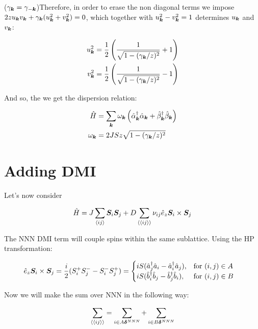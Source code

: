 ($\gamma_{\boldsymbol{k}} = \gamma_{-\boldsymbol{k}}$)Therefore, in order to erase the non diagonal terms we impose $2zu_{\boldsymbol{k}}v_{\boldsymbol{k}} + \gamma_{\boldsymbol{k}}(u_{\boldsymbol{k}}^2+v_{\boldsymbol{k}}^2) = 0$, which together with $u_{\boldsymbol{k}}^2-v_{\boldsymbol{k}}^2 = 1$ determines $u_{\boldsymbol{k}}$ and $v_{\boldsymbol{k}}$:

\begin{align*}
u_{\boldsymbol{k}}^2 &= \frac{1}{2}\left( \frac{1}{\sqrt{1-(\gamma_{\boldsymbol{k}}/z)^2}}+1\right) \\
v_{\boldsymbol{k}}^2 &= \frac{1}{2}\left( \frac{1}{\sqrt{1-(\gamma_{\boldsymbol{k}}/z)^2}}-1\right)
\end{align*}

And so, the we get the dispersion relation:

\begin{align}
\hat{H} &= \sum_{\boldsymbol{k}} \omega_{\boldsymbol{k}} \left( \hat{\alpha}_{\boldsymbol{k}}^\dagger \hat{\alpha}_{\boldsymbol{k}} +\hat{\beta}_{\boldsymbol{k}}^\dagger \hat{\beta}_{\boldsymbol{k}} \right) \\
\omega_{\boldsymbol{k}} &= 2JSz\sqrt{1-(\gamma_{\boldsymbol{k}}/z)^2}
\end{align}

\section{Adding DMI}

Let's now consider

\begin{equation}
\hat{H} = J \sum_{\langle i j \rangle} \boldsymbol{S}_i \boldsymbol{S}_j + D \sum_{\langle \langle i j \rangle \rangle} \nu_{ij}\hat{e}_z \boldsymbol{S}_i \times \boldsymbol{S}_j
\end{equation}

The NNN DMI term will couple spins within the same sublattice. Using the HP transformation:

\begin{equation}
\hat{e}_z \boldsymbol{S}_i \times \boldsymbol{S}_j = \frac{i}{2}(S_i^+S_j^--S_i^-S_j^+) = \begin{cases}
             iS(\hat{a}_j^\dagger\hat{a}_i-\hat{a}_i^\dagger\hat{a}_j),  & \text{for } (i,j) \in A \\
             iS(\hat{b}_i^\dagger\hat{b}_j-\hat{b}_j^\dagger\hat{b}_i),  & \text{for } (i,j) \in B
       \end{cases} \quad
\end{equation}

Now we will make the sum over NNN in the following way:

\begin{equation}
\sum_{\langle \langle i j \rangle \rangle} = \sum_{i\in A \boldsymbol{\delta}^{NNN}} +  \sum_{i\in B \boldsymbol{\delta}^{NNN}}
\end{equation}

